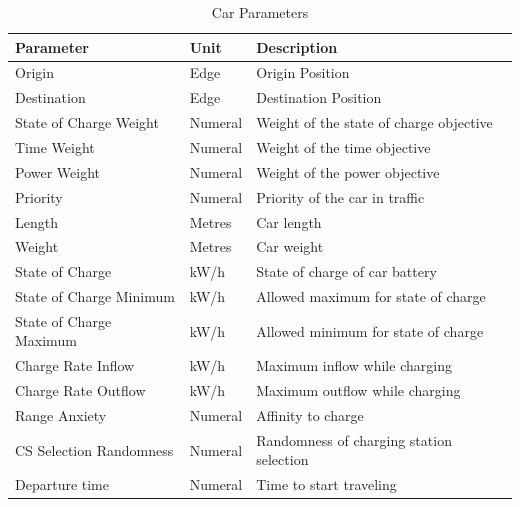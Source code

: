 \begin{table}[h]
	\renewcommand{\arraystretch}{1.3}
	\caption{Car Parameters}
	\centering
	\begin{tabular}{lll}
		\hline
		\textbf{Parameter}                    & \textbf{Unit} & \textbf{Description} \\ \hline
		Origin                                & Edge          & Origin Position      \\
		Destination                           & Edge          & Destination Position \\
		State of Charge Weight                & Numeral       & Weight of the state of charge objective                     \\
		Time Weight                           & Numeral       & Weight of the time objective                     \\
		Power Weight                          & Numeral       & Weight of the power objective                     \\
		Priority                              & Numeral       & Priority of the car in traffic                  \\
		Length                        	      & Metres        & Car length             \\
		Weight                        	      & Metres        & Car weight              \\
		State of Charge                       & kW/h          & State of charge of car battery                     \\
		State of Charge Minimum               & kW/h          & Allowed maximum for state of charge                    \\
		State of Charge Maximum               & kW/h          & Allowed minimum for state of charge                     \\
		Charge Rate Inflow                    & kW/h          & Maximum inflow while charging                     \\
		Charge Rate Outflow                   & kW/h          & Maximum outflow while charging                     \\
		Range Anxiety                         & Numeral       & Affinity to charge                     \\
		CS Selection Randomness 			  & Numeral       & Randomness of charging station selection                     \\ 
		Departure time 			  			  & Numeral       & Time to start traveling                    \\ \hline
	\end{tabular}
\end{table}

